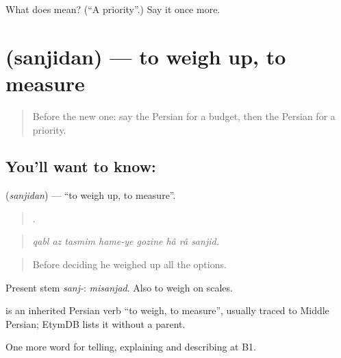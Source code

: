 \begin{tcolorbox}[breakable,colback=teal!4,colframe=teal!35!black,title={Before you move on}]
What does  mean? (\textquotedblleft{}A priority\textquotedblright{}.) Say it once more.
\end{tcolorbox}
\section[\texorpdfstring{\fa{سنجیدن} (sanjidan)}{سنجیدن (sanjidan)}]{ (sanjidan) — to weigh up, to measure}

\label{lesson:FA-C398-sanjidan}



\begin{quote}
Before the new one: say the Persian for a budget, then the Persian for a priority.
\end{quote}

\subsection*{You'll want to know: }
\textbf{} (\emph{sanjidan}) — \textquotedblleft{}to weigh up, to measure\textquotedblright{}.

\begin{quote}
       .
\end{quote}

\begin{quote}
\emph{qabl az tasmim hame-ye gozine hâ râ sanjid.}
\end{quote}

\begin{quote}
Before deciding he weighed up all the options.
\end{quote}

Present stem \emph{sanj-}: \emph{misanjad}. Also to weigh on scales.

\begin{cousinweb}
\textbf{} is an inherited Persian verb \textquotedblleft{}to weigh, to measure\textquotedblright{}, usually traced to Middle Persian; EtymDB lists it without a parent.
\end{cousinweb}

\begin{grammarlens}[title={What you've built}]
One more word for telling, explaining and describing at B1.
\end{grammarlens}

